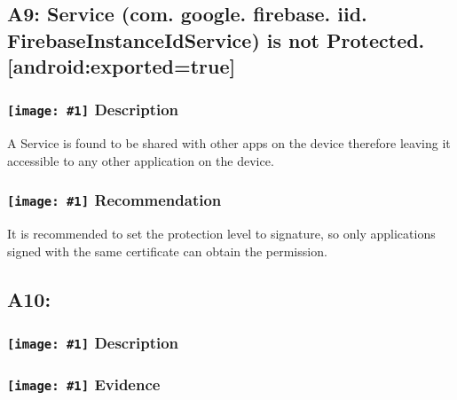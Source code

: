 \documentclass[12p]{article}
\newcommand{\icon}[1]{\texttt{[image: \#1]}}
\begin{document}
\subsection{A9: Service (com. google. firebase. iid. FirebaseInstanceIdService) is not Protected. [android:exported=true]}
\subsubsection*{\protect\icon{/home/miki/Documents/GITHUB/AndroidPermissions/python/vulns/report_icons/basic_sheet.png} Description}
A Service is found to be shared with other apps on the device therefore leaving it accessible to any other application on the device.
\subsubsection*{\protect\icon{/home/miki/Documents/GITHUB/AndroidPermissions/python/vulns/report_icons/basic_todo.png} Recommendation}
It is recommended to set the protection level to signature, so only applications signed with the same certificate can obtain the permission.
\subsection{A10: }
\subsubsection*{\protect\icon{/home/miki/Documents/GITHUB/AndroidPermissions/python/vulns/report_icons/basic_sheet.png} Description}

\subsubsection*{\protect\icon{/home/miki/Documents/GITHUB/AndroidPermissions/python/vulns/report_icons/basic_magnifier.png} Evidence}



\end{document}
